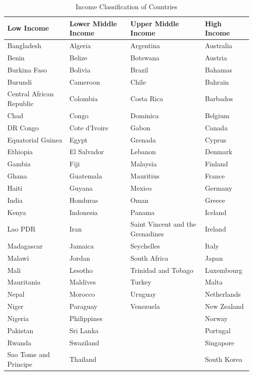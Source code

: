 \documentclass[12pt, titlepage]{article}
\numberwithin{equation}{section}
\begin{document}
\begin{table}[htbp]
	\centering
	\caption{Income Classification of Countries}
	\label{table:table1}
	\begin{threeparttable}
		\scriptsize
		\begin{tabular}{llll}
			\toprule
			\textbf{Low Income} & \textbf{Lower Middle Income} & \textbf{Upper Middle Income} & \textbf{High Income} \\
			\midrule
			Bangladesh & Algeria & Argentina & Australia \\
			Benin & Belize & Botswana & Austria \\
			Burkina Faso & Bolivia & Brazil & Bahamas \\
			Burundi & Cameroon & Chile & Bahrain \\
			Central African Republic & Colombia & Costa Rica & Barbados \\
			Chad & Congo & Dominica & Belgium \\
			DR Congo & Cote d'Ivoire & Gabon & Canada \\
			Equatorial Guinea & Egypt & Grenada & Cyprus \\
			Ethiopia & El Salvador & Lebanon & Denmark \\
			Gambia & Fiji & Malaysia & Finland \\
			Ghana & Guatemala & Mauritius & France \\
			Haiti & Guyana & Mexico & Germany \\
			India & Honduras & Oman & Greece \\
			Kenya & Indonesia & Panama & Iceland \\
			Lao PDR & Iran & Saint Vincent and the Grenadines & Ireland \\
			Madagascar & Jamaica & Seychelles & Italy \\
			Malawi & Jordan & South Africa & Japan \\
			Mali & Lesotho & Trinidad and Tobago & Luxembourg \\
			Mauritania & Maldives & Turkey & Malta \\
			Nepal & Morocco & Uruguay & Netherlands \\
			Niger & Paraguay & Venezuela & New Zealand \\
			Nigeria & Philippines & & Norway \\
			Pakistan & Sri Lanka & & Portugal \\
			Rwanda & Swaziland & & Singapore \\
			Sao Tome and Principe & Thailand & & South Korea \\

\end{tabular}
\end{threeparttable}
\end{table}
\end{document}
